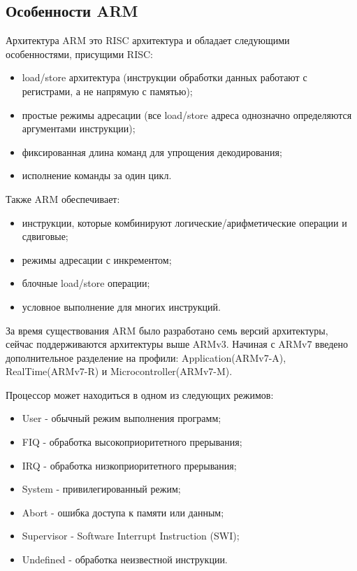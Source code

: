 
\subsection{Особенности ARM}
Архитектура ARM это RISC архитектура и обладает следующими особенностями, присущими RISC\cite{bib:arm_arch_manual}:

\begin{itemize}
    \item load/store архитектура (инструкции обработки данных работают с регистрами, а не напрямую с памятью);
    \item простые режимы адресации (все load/store адреса однозначно определяются аргументами инструкции);
    \item фиксированная длина команд для упрощения декодирования;
    \item исполнение команды за один цикл.
\end{itemize}

Также ARM обеспечивает:

\begin{itemize}
    \item инструкции, которые комбинируют логические/арифметические операции и сдвиговые;
    \item режимы адресации с инкрементом;
    \item блочные load/store операции;
    \item условное выполнение для многих инструкций.
\end{itemize}

За время существования ARM было разработано семь версий архитектуры, сейчас поддерживаются архитектуры выше ARMv3. Начиная с ARMv7 введено дополнительное разделение на профили: Application(ARMv7-A), RealTime(ARMv7-R) и Microcontroller(ARMv7-M).

Процессор может находиться в одном из следующих режимов:
\begin{itemize}
    \item User - обычный режим выполнения программ;
    \item FIQ - обработка высокоприоритетного прерывания;
    \item IRQ - обработка низкоприоритетного прерывания;
    \item System - привилегированный режим;
    \item Abort - ошибка доступа к памяти или данным;
    \item Supervisor - Software Interrupt Instruction (SWI);
    \item Undefined - обработка неизвестной инструкции.
\end{itemize}

